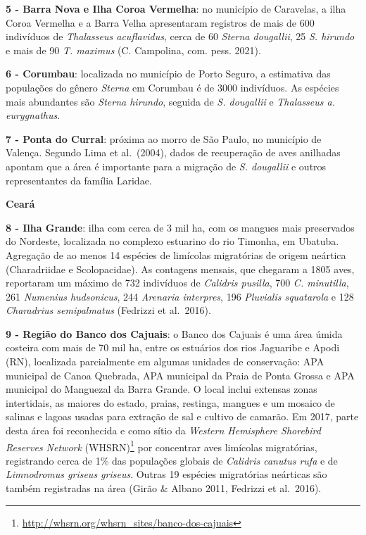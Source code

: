 \documentclass[
  oneside]{scrbook}
\DeclareRobustCommand{\href}[2]{#2\footnote{\url{#1}}}
\begin{document}
\textbf{5 - Barra Nova e Ilha Coroa Vermelha}: no município de Caravelas, a ilha Coroa Vermelha e a Barra Velha apresentaram registros de mais de 600 indivíduos de \emph{Thalasseus acuflavidus}, cerca de 60 \emph{Sterna dougallii}, 25 \emph{S. hirundo} e mais de 90 \emph{T. maximus} (C. Campolina, com. pess. 2021).

\textbf{6 - Corumbau}: localizada no município de Porto Seguro, a estimativa das populações do gênero \emph{Sterna} em Corumbau é de 3000 indivíduos. As espécies mais abundantes são \emph{Sterna hirundo}, seguida de \emph{S. dougallii} e \emph{Thalasseus a. eurygnathus}.

\textbf{7 - Ponta do Curral}: próxima ao morro de São Paulo, no município de Valença. Segundo Lima et al.~(2004), dados de recuperação de aves anilhadas apontam que a área é importante para a migração de \emph{S. dougallii} e outros representantes da família Laridae.

\textbf{Ceará}

\textbf{8 - Ilha Grande}: ilha com cerca de 3 mil ha, com os mangues mais preservados do Nordeste, localizada no complexo estuarino do rio Timonha, em Ubatuba. Agregação de ao menos 14 espécies de limícolas migratórias de origem neártica (Charadriidae e Scolopacidae). As contagens mensais, que chegaram a 1805 aves, reportaram um máximo de 732 indivíduos de \emph{Calidris pusilla}, 700 \emph{C. minutilla}, 261 \emph{Numenius hudsonicus}, 244 \emph{Arenaria interpres}, 196 \emph{Pluvialis squatarola} e 128 \emph{Charadrius semipalmatus} (Fedrizzi et al.~2016).

\textbf{9 - Região do Banco dos Cajuais}: o Banco dos Cajuais é uma área úmida costeira com mais de 70 mil ha, entre os estuários dos rios Jaguaribe e Apodi (RN), localizada parcialmente em algumas unidades de conservação: APA municipal de Canoa Quebrada, APA municipal da Praia de Ponta Grossa e APA municipal do Manguezal da Barra Grande. O local inclui extensas zonas intertidais, as maiores do estado, praias, restinga, mangues e um mosaico de salinas e lagoas usadas para extração de sal e cultivo de camarão. Em 2017, parte desta área foi reconhecida e como \href{http://whsrn.org/whsrn_sites/banco-dos-cajuais}{sítio da \emph{Western Hemisphere Shorebird Reserves Network} (WHSRN)} por concentrar aves limícolas migratórias, registrando cerca de 1\% das populações globais de \emph{Calidris canutus rufa} e de \emph{Limnodromus griseus griseus}. Outras 19 espécies migratórias neárticas são também registradas na área (Girão \& Albano 2011, Fedrizzi et al.~2016).
\end{document}
